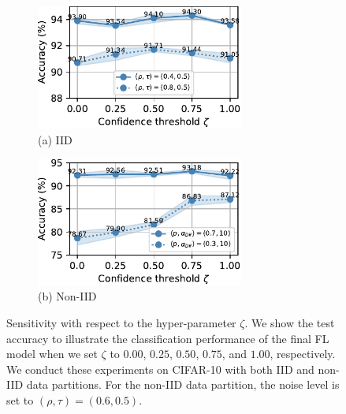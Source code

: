 \documentclass[letterpaper]{article} %
\begin{document}
\begin{figure}[t]
    \centering
    \begin{subfigure}{.45\textwidth}
        \centering
        \includegraphics[width=0.75\textwidth]{figures/parameter_sensitivity_iid.pdf}
        \caption*{(a) IID}
    \end{subfigure}
    \begin{subfigure}{.45\textwidth}
        \centering
        \includegraphics[width=0.75\textwidth]{figures/parameter_sensitivity_noniid.pdf}
        \caption*{(b) Non-IID}
    \end{subfigure}

    \caption{Sensitivity with respect to the hyper-parameter $\zeta$. We show the test accuracy to illustrate the classification performance of the final FL model when we set $\zeta$ to $0.00$, $0.25$, $0.50$, $0.75$, and $1.00$, respectively. We conduct these experiments on CIFAR-10 with both IID and non-IID data partitions. For the non-IID data partition, the noise level is set to $(\rho, \tau)=(0.6, 0.5)$.}
    \label{Figure:Hyper-Parameter-Sensitivity}
\end{figure}
\end{document}
